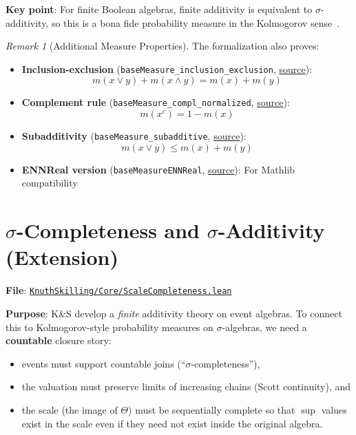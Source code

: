 \documentclass[11pt]{article}
\theoremstyle{definition}
\theoremstyle{remark}
\newtheorem{remark}[theorem]{Remark}
\begin{document}
\textbf{Key point}: For finite Boolean algebras, finite additivity is equivalent to $\sigma$-additivity, so this is a bona fide probability measure in the Kolmogorov sense~\cite{Kolmogorov1933}.

\begin{remark}[Additional Measure Properties]
The formalization also proves:
\begin{itemize}
\item \textbf{Inclusion-exclusion} (\texttt{baseMeasure\_inclusion\_exclusion}, \href{https://github.com/zariuq/ks-foundations-of-inference/blob/main/KnuthSkilling/Probability/ConditionalProbability/Basic.lean}{source}):
  \[ m(x \vee y) + m(x \wedge y) = m(x) + m(y) \]
\item \textbf{Complement rule} (\texttt{baseMeasure\_compl\_normalized}, \href{https://github.com/zariuq/ks-foundations-of-inference/blob/main/KnuthSkilling/Probability/ConditionalProbability/Basic.lean}{source}):
  \[ m(x^c) = 1 - m(x) \]
\item \textbf{Subadditivity} (\texttt{baseMeasure\_subadditive}, \href{https://github.com/zariuq/ks-foundations-of-inference/blob/main/KnuthSkilling/Probability/ConditionalProbability/Basic.lean}{source}):
  \[ m(x \vee y) \leq m(x) + m(y) \]
\item \textbf{ENNReal version} (\texttt{baseMeasureENNReal}, \href{https://github.com/zariuq/ks-foundations-of-inference/blob/main/KnuthSkilling/Probability/ConditionalProbability/Basic.lean}{source}): For Mathlib compatibility
\end{itemize}
\end{remark}

\section{$\sigma$-Completeness and $\sigma$-Additivity (Extension)}

\textbf{File}: \href{https://github.com/zariuq/ks-foundations-of-inference/blob/main/KnuthSkilling/Core/ScaleCompleteness.lean}{\texttt{KnuthSkilling/Core/ScaleCompleteness.lean}}

\textbf{Purpose}: K\&S develop a \emph{finite} additivity theory on event algebras.  To connect this to
Kolmogorov-style probability measures on $\sigma$-algebras, we need a \textbf{countable} closure story:
\begin{itemize}
\item events must support countable joins (``$\sigma$-completeness''),
\item the valuation must preserve limits of increasing chains (Scott continuity), and
\item the scale (the image of $\Theta$) must be sequentially complete so that $\sup$ values exist in the
scale even if they need not exist inside the original algebra.
\end{itemize}
\end{document}
